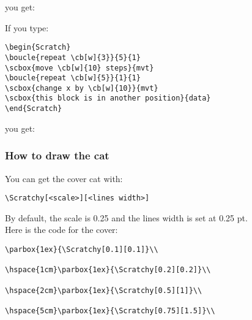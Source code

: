 \documentclass[a4paper,11pt]{article}
\begin{document}
you get:\\

\begin{Scratch}
\blank
{}
\end{Scratch}

\vspace{0.5cm}

If you type:
\begin{verbatim}
\begin{Scratch}
\boucle{repeat \cb[w]{3}}{5}{1}
\scbox{move \cb[w]{10} steps}{mvt}
\boucle{repeat \cb[w]{5}}{1}{1}
\scbox{change x by \cb[w]{10}}{mvt}
\scbox{this block is in another position}{data}
\end{Scratch}
\end{verbatim}

you get:\\

\begin{Scratch}
\end{Scratch}

\subsubsection{How to draw the cat}

You can get the cover cat with:

\texttt{\small\textbackslash Scratchy[<scale>][<lines width>]}

By default, the scale is 0.25 and the lines width is set at 0.25 pt.\\

Here is the code for the cover:
\begin{verbatim}
\parbox{1ex}{\Scratchy[0.1][0.1]}\\

\hspace{1cm}\parbox{1ex}{\Scratchy[0.2][0.2]}\\

\hspace{2cm}\parbox{1ex}{\Scratchy[0.5][1]}\\

\hspace{5cm}\parbox{1ex}{\Scratchy[0.75][1.5]}\\
\end{verbatim}
\end{document}
